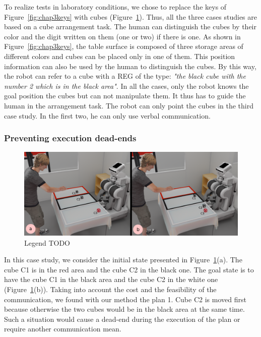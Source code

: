 \documentclass[a4paper,11pt,twoside]{StyleThese}
\begin{document}
To realize tests in laboratory conditions, we chose to replace the keys of Figure~\ref{fig:chap3keys} with cubes (Figure~\ref{fig:chap3scen1}). Thus, all the three cases studies are based on a cube arrangement task. The human can distinguish the cubes by their color and the digit written on them (one or two) if there is one. As shown in Figure~\ref{fig:chap3keys}, the table surface is composed of three storage areas of different colors and cubes can be placed only in one of them. This position information can also be used by the human to distinguish the cubes. By this way, the robot can refer to a cube with a REG of the type: \textit{"the black cube with the number 2 which is in the black area"}. In all the cases, only the robot knows the goal position the cubes but can not manipulate them. It thus has to guide the human in the arrangement task. The robot can only point the cubes in the third case study. In the first two, he can only use verbal communication.

\subsubsection{Preventing execution dead-ends}
\begin{figure}[t!]
\centering
\includegraphics[width=\textwidth]{figures/chapter3/Chap3scen1.png}
\caption{\label{fig:chap3scen1} Legend TODO}
\end{figure}
In this case study, we consider the initial state presented in Figure~\ref{fig:chap3scen1}(a). The cube C1 is in the red area and the cube C2 in the black one. The goal state is to have the cube C1 in the black area and the cube C2 in the white one (Figure~\ref{fig:chap3scen1}(b)).
Taking into account the cost and the feasibility of the communication, we found with our method the plan 1. Cube C2 is moved first because otherwise the two cubes would be in the black area at the same time. Such a situation would cause a dead-end during the execution of the plan or require another communication mean.
\end{document}
